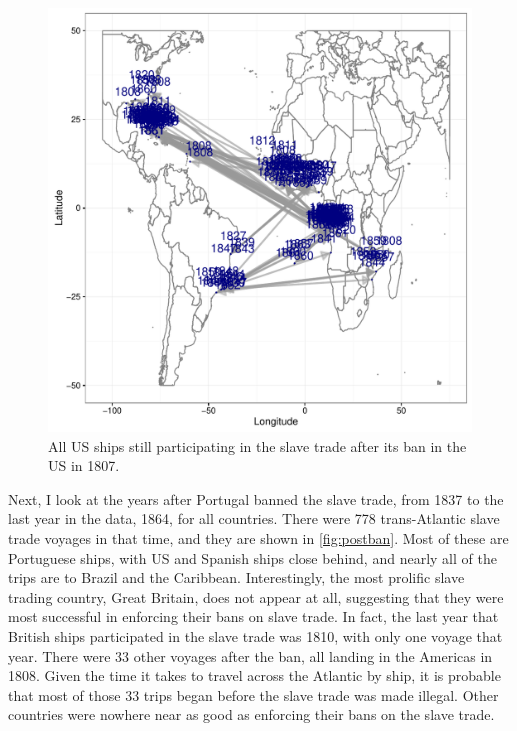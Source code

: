 \documentclass[DIV=calc, paper=a4, fontsize=10pt, twocolumn]{scrartcl}\usepackage[]{graphicx}\usepackage[]{color}
\makeatletter
\def\maxwidth{ %
  \ifdim\Gin@nat@width>\linewidth
    \linewidth
  \else
    \Gin@nat@width
  \fi
}
\newenvironment{knitrout}{}{} %
\makeatother
\begin{document}
\begin{knitrout}
\color{fgcolor}\begin{figure}[h]
\includegraphics[width=\maxwidth]{figure/us1808-1} \caption[All US ships still participating in the slave trade after its ban in the US in 1807]{All US ships still participating in the slave trade after its ban in the US in 1807.}\label{fig:us1808}
\end{figure}


\end{knitrout}

\par Next, I look at the years after Portugal banned the slave trade, from 1837 to the last year in the data, 1864, for all countries.  There were 778 trans-Atlantic slave trade voyages in that time, and they are shown in \autoref{fig:postban}. Most of these are Portuguese ships, with US and Spanish ships close behind, and nearly all of the trips are to Brazil and the Caribbean.  Interestingly, the most prolific slave trading country, Great Britain, does not appear at all, suggesting that they were most successful in enforcing their bans on slave trade. In fact, the last year that British ships participated in the slave trade was 1810, with only one voyage that year. There were 33 other voyages after the ban, all landing in the Americas in 1808. Given the time it takes to travel across the Atlantic by ship, it is probable that most of those 33 trips began before the slave trade was made illegal. Other countries were nowhere near as good as enforcing their bans on the slave trade. 
\end{document}
